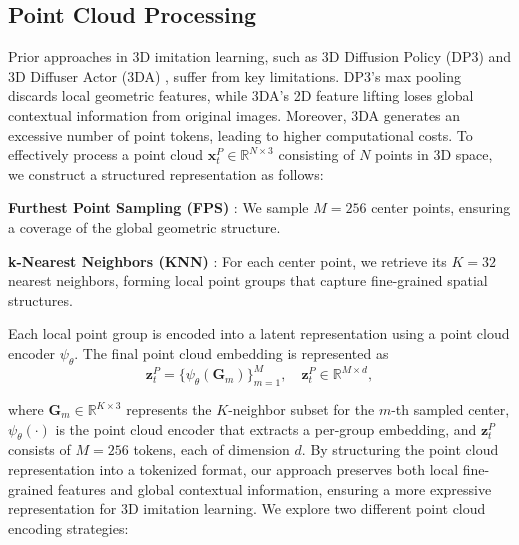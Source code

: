 
\subsection{Point Cloud Processing}
\label{sec:pc_processing}

Prior approaches in 3D imitation learning, such as 3D Diffusion Policy (DP3) \cite{ze20243d} and 3D Diffuser Actor (3DA) \cite{ke20243d}, suffer from key limitations. DP3’s max pooling discards local geometric features, while 3DA’s 2D feature lifting loses global contextual information from original images. Moreover, 3DA generates an excessive number of point tokens, leading to higher computational costs.
%
To effectively process a point cloud \( \mathbf{x}_t^P \in \mathbb{R}^{N \times 3} \) consisting of \( N \) points in 3D space, we construct a structured representation as follows:

\textbf{Furthest Point Sampling (FPS)} \cite{eldar1994farthest, qi2017pointnet}: We sample \( M = 256 \) center points, ensuring a coverage of the global geometric structure.

\textbf{k-Nearest Neighbors (KNN)} \cite{qi2017pointnet++}: For each center point, we retrieve its \( K = 32 \) nearest neighbors, forming local point groups that capture fine-grained spatial structures.


Each local point group is encoded into a latent representation using a point cloud encoder \( \psi_\theta \). The final point cloud embedding is represented as
\begin{equation}
    \mathbf{z}_t^P = \{ \psi_\theta(\textbf{G}_m) \}_{m=1}^{M}, \quad \mathbf{z}_t^P \in \mathbb{R}^{M \times d},
\end{equation}

where $\textbf{G}_m \in \mathbb{R}^{K \times 3}$ represents the $K$-neighbor subset for the $m$-th sampled center, $\psi_\theta(\cdot)$ is the point cloud encoder that extracts a per-group embedding, and $\mathbf{z}_t^P$ consists of $M = 256$ tokens, each of dimension $d$.
%
By structuring the point cloud representation into a tokenized format, our approach preserves both local fine-grained features and global contextual information, ensuring a more expressive representation for 3D imitation learning.
We explore two different point cloud encoding strategies:

